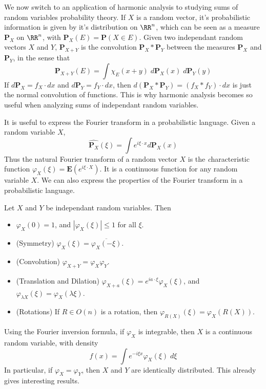 We now switch to an application of harmonic analysis to studying sums of random variables probability theory. If $X$ is a random vector, it's probabilistic information is given by it's distribution on $\RR^n$, which can be seen as a measure $\mathbf{P}_X$ on $\RR^n$, with $\mathbf{P}_X(E) = \mathbf{P}(X \in E)$. Given two independant random vectors $X$ and $Y$, $\mathbf{P}_{X+Y}$ is the convolution $\mathbf{P}_X * \mathbf{P}_Y$ between the measures $\mathbf{P}_X$ and $\mathbf{P}_Y$, in the sense that
%
\[ \mathbf{P}_{X+Y}(E) = \int \chi_E(x+y)\; d\mathbf{P}_X(x)\; d\mathbf{P}_Y(y) \]
%
If $d\mathbf{P}_X = f_X \cdot dx$ and $d\mathbf{P}_Y = f_Y \cdot dx$, then $d(\mathbf{P}_X * \mathbf{P}_Y) = (f_X * f_Y) \cdot dx$ is just the normal convolution of functions. This is why harmonic analysis becomes so useful when analyzing sums of independant random variables.

It is useful to express the Fourier transform in a probabilistic language. Given a random variable $X$,
%
\[ \widehat{\mathbf{P}_X}(\xi) = \int e^{i \xi \cdot x} d\mathbf{P}_X(x) \]
%
Thus the natural Fourier transform of a random vector $X$ is the {\emph characteristic function} $\varphi_X(\xi) = \mathbf{E}(e^{i \xi \cdot X})$. It is a continuous function for any random variable $X$. We can also express the properties of the Fourier transform in a probabilistic language.

\begin{lemma}
    Let $X$ and $Y$ be independant random variables. Then
    \begin{itemize}
        \item $\varphi_X(0) = 1$, and $|\varphi_X(\xi)| \leq 1$ for all $\xi$.

        \item (Symmetry) $\varphi_X(\xi) = \overline{\varphi_X(-\xi)}$.

        \item (Convolution) $\varphi_{X+Y} = \varphi_X \varphi_Y$.

        \item (Translation and Dilation) $\varphi_{X+a}(\xi) = e^{i a \cdot \xi} \varphi_X(\xi)$, and $\varphi_{\lambda X}(\xi) = \varphi_X(\lambda \xi)$.

        \item (Rotations) If $R \in O(n)$ is a rotation, then $\varphi_{R(X)}(\xi) = \varphi_X(R(X))$.
    \end{itemize}
\end{lemma}

Using the Fourier inversion formula, if $\varphi_X$ is integrable, then $X$ is a continuous random variable, with density
%
\[ f(x) = \int e^{- i \xi x} \varphi_X(\xi)\; d\xi \]
%
In particular, if $\varphi_X = \varphi_Y$, then $X$ and $Y$ are identically distributed. This already gives interesting results.

